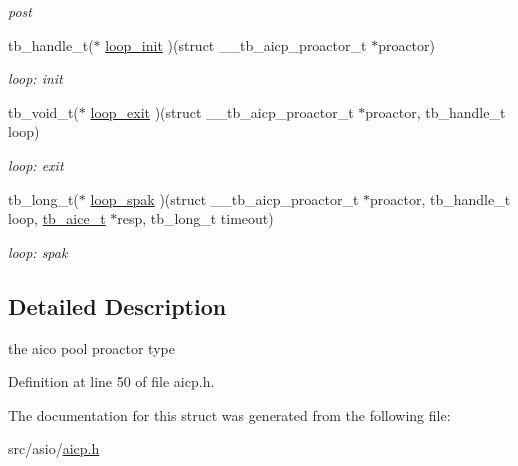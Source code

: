 \begin{DoxyCompactItemize}
\begin{DoxyCompactList}\small\item\em post \end{DoxyCompactList}\item 
\hypertarget{structtb__aicp__proactor__t_a8f65dafb03db7bd0827fbd7bb82f0d58}{tb\-\_\-handle\-\_\-t($\ast$ \hyperlink{structtb__aicp__proactor__t_a8f65dafb03db7bd0827fbd7bb82f0d58}{loop\-\_\-init} )(struct \-\_\-\-\_\-tb\-\_\-aicp\-\_\-proactor\-\_\-t $\ast$proactor)}\label{structtb__aicp__proactor__t_a8f65dafb03db7bd0827fbd7bb82f0d58}

\begin{DoxyCompactList}\small\item\em loop\-: init \end{DoxyCompactList}\item 
\hypertarget{structtb__aicp__proactor__t_a13d653dc1634c531edd2ddb1a1696787}{tb\-\_\-void\-\_\-t($\ast$ \hyperlink{structtb__aicp__proactor__t_a13d653dc1634c531edd2ddb1a1696787}{loop\-\_\-exit} )(struct \-\_\-\-\_\-tb\-\_\-aicp\-\_\-proactor\-\_\-t $\ast$proactor, tb\-\_\-handle\-\_\-t loop)}\label{structtb__aicp__proactor__t_a13d653dc1634c531edd2ddb1a1696787}

\begin{DoxyCompactList}\small\item\em loop\-: exit \end{DoxyCompactList}\item 
\hypertarget{structtb__aicp__proactor__t_ac2d4b27f0381b05d003ced548f5cf212}{tb\-\_\-long\-\_\-t($\ast$ \hyperlink{structtb__aicp__proactor__t_ac2d4b27f0381b05d003ced548f5cf212}{loop\-\_\-spak} )(struct \-\_\-\-\_\-tb\-\_\-aicp\-\_\-proactor\-\_\-t $\ast$proactor, tb\-\_\-handle\-\_\-t loop, \hyperlink{structtb__aice__t}{tb\-\_\-aice\-\_\-t} $\ast$resp, tb\-\_\-long\-\_\-t timeout)}\label{structtb__aicp__proactor__t_ac2d4b27f0381b05d003ced548f5cf212}

\begin{DoxyCompactList}\small\item\em loop\-: spak \end{DoxyCompactList}\end{DoxyCompactItemize}


\subsection{Detailed Description}
the aico pool proactor type 

Definition at line 50 of file aicp.\-h.



The documentation for this struct was generated from the following file\-:\begin{DoxyCompactItemize}
\item 
src/asio/\hyperlink{aicp_8h}{aicp.\-h}\end{DoxyCompactItemize}
